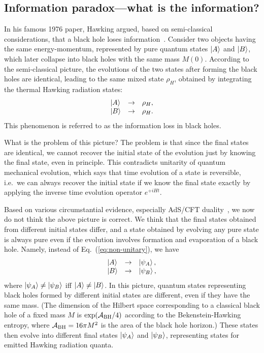 \documentclass[12pt]{article}
\begin{document}
\subsection{Information paradox---what is the information?}
\label{subsec:info_para}

In his famous 1976 paper, Hawking argued, based on semi-classical 
considerations, that a black hole loses information~\cite{Hawking:1976ra}. 
Consider two objects having the same energy-momentum, represented by 
pure quantum states $\left| A \right>$ and $\left| B \right>$, which later collapse into 
black holes with the same mass $M(0)$.  According to the semi-classical 
picture, the evolutions of the two states after forming the black holes 
are identical, leading to the same mixed state $\rho_H$, obtained by 
integrating the thermal Hawking radiation states:
%
\begin{equation}
\begin{array}{lll}
  \ket{A} &\rightarrow& \rho_H, \\
  \ket{B} &\rightarrow& \rho_H.
\end{array}
\label{eq:non-unitary}
\end{equation}
%
This phenomenon is referred to as the information loss in black holes.

What is the problem of this picture?  The problem is that since the 
final states are identical, we cannot recover the initial state of the 
evolution just by knowing the final state, even in principle.  This 
contradicts unitarity of quantum mechanical evolution, which says that 
time evolution of a state is reversible, i.e.\ we can always recover 
the initial state if we know the final state exactly by applying the 
inverse time evolution operator $e^{+iHt}$.

Based on various circumstantial evidence, especially AdS/CFT 
duality~\cite{Maldacena:1997re}, we now do not think the above picture 
is correct.  We think that the final states obtained from different initial 
states differ, and a state obtained by evolving any pure state is always 
pure even if the evolution involves formation and evaporation of a black 
hole.  Namely, instead of Eq.~(\ref{eq:non-unitary}), we have
%
\begin{equation}
\begin{array}{lll}
  \ket{A} &\rightarrow& \ket{\psi_A}, \\
  \ket{B} &\rightarrow& \ket{\psi_B},
\end{array}
\label{eq:unitary}
\end{equation}
%
where $\left| \psi_A \right> \neq \left| \psi_B \right>$ iff $\left| A \right> \neq \left| B \right>$.  In 
this picture, quantum states representing black holes formed by different 
initial states are different, even if they have the same mass.  (The 
dimension of the Hilbert space corresponding to a classical black hole 
of a fixed mass $M$ is $\exp({\cal A}_{\rm BH}/4)$ according to the 
Bekenstein-Hawking entropy, where ${\cal A}_{\rm BH} = 16\pi M^2$ is 
the area of the black hole horizon.)  These states then evolve into 
different final states $\left| \psi_A \right>$ and $\left| \psi_B \right>$, representing 
states for emitted Hawking radiation quanta.
\end{document}
